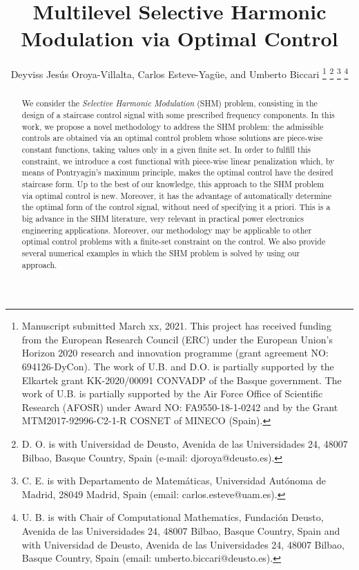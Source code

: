 \documentclass[9pt,shortpaper,twoside,web]{ieeecolor}
\begin{document}
	
\title{Multilevel Selective Harmonic Modulation via Optimal Control} 

\author{Deyviss Jes\'us Oroya-Villalta, Carlos Esteve-Yag\"ue, and Umberto Biccari
\thanks{Manuscript submitted March xx, 2021. This project has received funding from the European Research Council (ERC) under the European Union’s Horizon 2020 research and innovation programme (grant agreement NO: 694126-DyCon). The work of U.B. and D.O. is partially supported by the Elkartek grant KK-2020/00091 CONVADP of the Basque government. The work of U.B. is partially supported by the Air Force Office of Scientific Research (AFOSR) under Award NO: FA9550-18-1-0242 and by the Grant MTM2017-92996-C2-1-R COSNET of MINECO (Spain).}
\thanks{D. O. is with Universidad de Deusto, Avenida de las Universidades 24, 48007 Bilbao, Basque Country, Spain (e-mail: djoroya@deusto.es).}
\thanks{C. E. is with Departamento de Matem\'aticas, Universidad Aut\'onoma de Madrid, 28049 Madrid, Spain (email: carlos.esteve@uam.es).}
\thanks{U. B. is with Chair of Computational Mathematics, Fundaci\'on Deusto, Avenida de las Universidades 24, 48007 Bilbao, Basque Country, Spain and with Universidad de Deusto, Avenida de las Universidades 24, 48007 Bilbao, Basque Country, Spain (email: umberto.biccari@deusto.es).}
} 
\maketitle

\begin{abstract}
	We consider the \emph{Selective Harmonic Modulation} (SHM) problem, consisting in the design of a staircase control signal with some prescribed frequency components. In this work, we propose a novel methodology to  address the SHM problem: the admissible controls are obtained via an optimal control problem whose solutions are piece-wise constant functions, taking values only in a given finite set. In order to fulfill this constraint, we introduce a cost functional with piece-wise linear penalization which, by means of Pontryagin's maximum principle, makes the optimal control have the desired staircase form. Up to the best of our knowledge, this approach to the SHM problem via optimal control is new. Moreover, it has the  advantage of automatically determine the optimal form of the control signal, without need of specifying it a priori. This is a big advance in the SHM literature, very relevant in practical power electronics engineering applications. Moreover, our methodology may be applicable to other optimal control problems with a finite-set constraint on the control. We also provide several numerical examples in which the SHM problem is solved by using our approach.
\end{abstract}
\end{document}
